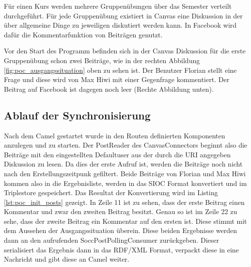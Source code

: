 Für einen Kurs werden mehrere Gruppenübungen über das Semester verteilt durchgeführt. Für jede Gruppenübung existiert in Canvas eine Diskussion in der über allgemeine Dinge zu jeweiligen diskutiert werden kann. In Facebook wird dafür die Kommentarfunktion von Beiträgen genutzt. 

Vor den Start des Programm befinden sich in der Canvas Diskussion für die erste Gruppenübung schon zwei Beiträge, wie in der rechten Abbildung \ref{fig:poc_ausgangssituation} oben zu sehen ist. Der Benutzer Florian stellt eine Frage und diese wird von Max Hiwi mit einer Gegenfrage kommentiert. Der Beitrag auf Facebook ist dagegen noch leer (Rechte Abbildung unten).

\wrapfill

\subsection{Ablauf der Synchronisierung} %
\label{sub:ablauf_der_synchronisierung}

Nach dem Camel gestartet wurde in den Routen definierten Komponenten anzulegen und zu starten. Der PostReader des CanvasConnectors beginnt also die Beiträge mit den eingestellten Defaultuser aus der durch die URI angegeben Diskussion zu lesen. Da dies der erste Aufruf ist, werden die Beiträge noch nicht nach den Erstellungszeitpunk gefiltert. Beide Beiträge von Florian und Max Hiwi kommen also in die Ergebnisliste, werden in das SIOC Format konvertiert und im Triplestore gespeichert. Das Resultat der Konvertierung wird im Listing \ref{lst:poc_init_posts} gezeigt. In Zeile 11 ist zu sehen, dass der erste Beitrag einen Kommentar und zwar den zweiten Beitrag besitzt. Genau so ist im Zeile 22 zu sehe, dass der zweite Beitrag ein Kommentar auf den ersten ist. Diese stimmt mit dem Aussehen der Ausgangssituation überein. Diese beiden Ergebnisse werden dann an den aufrufenden SoccPostPollingConsumer zurückgeben. Dieser serialisiert das Ergebnis dann in das RDF/XML Format, verpackt diese in eine Nachricht und gibt diese an Camel weiter.


